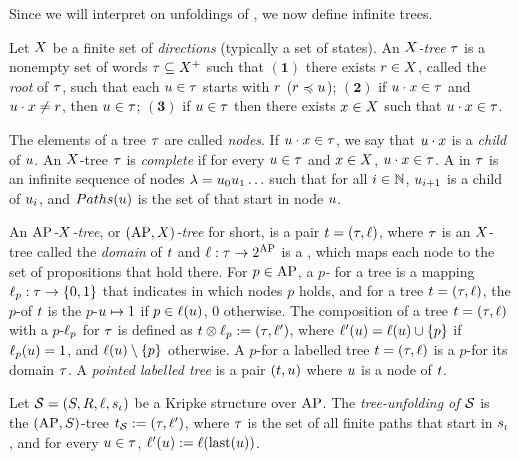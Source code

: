Since we will interpret \QCTLs on unfoldings of \KS, we now define
infinite trees.

\halfline
{}
Let $X$ be a finite set of \emph{directions} (typically a set of states). 
An \emph{$X$-tree} $\tau$ 
 is a nonempty set of words $\tau\subseteq X^+$ such that
 $\bm{(1)}$ there exists $r\in X$,  called the
    \emph{root} of $\tau$, such that each
    $u\in\tau$ starts with $r$ ($r\preccurlyeq u$);
$\bm{(2)}$  if $u\cdot x\in\tau$ and $u\cdot x\neq r$, then
    $u\in\tau$;
 $\bm{(3)}$ if $u\in\tau$ then there exists $x\in X$ such that $u\cdot x\in\tau$.

 The elements of a tree $\tau$ are called \emph{nodes}.  
  If 
 $u\cdot x \in \tau$, we say that $u\cdot x$ is a \emph{child} of
 $u$.
An $X$-tree $\tau$ is \emph{complete} if for every $u \in
\tau$ and  $x \in X$,  $u \cdot x \in \tau$.
A \emph{\tpath} in $\tau$ is an infinite sequence of nodes $\tpath=\noeud_0\noeud_1\ldots$
such that for all $i\in\mathbb N$, $u_{i+1}$ is a child of
$u_i$,
and $Paths(u)$ is the set of \tpaths
 that start in node $u$. 

 An \emph{$\textnormal{AP}$- $X$-tree}, or
\emph{$(\textnormal{AP},X)$-tree} for short, is a pair
$t=(\tau,\ell)$, where $\tau$ is an $X$-tree called the
\emph{domain} of $t$ and
$\ell:\tau \rightarrow 2^{\textnormal{AP}}$ is a \emph{}, which maps
each node to the set of propositions that hold there.
 For $p\in\textnormal{AP}$, a \emph{$p$-} for a  tree is a mapping
$\ell_{p}:\tau\to \{0,1\}$ that indicates in which nodes $p$ holds, and
for a  tree $t=(\tau,\ell)$, the $p$- of $t$ is
the $p$- $u \mapsto 1$ if $p\in\ell(u)$, 0 otherwise. 
The composition of a  tree $t=(\tau,\ell)$ with a
$p$- $\ell_{p}$ for $\tau$ is defined as
$t\otimes\ell_{p}:=(\tau,\ell')$, where
$\ell'(u)=\ell(u)\cup \{p\}$ if $\ell_{p}(u)=1$, and
$\ell(u)\setminus \{p\}$ otherwise.
A $p$- for a labelled tree $t=(\tau,\ell)$ is a
$p$- for its domain $\tau$.
A \emph{pointed labelled tree} is a pair $(t,u)$ where
 $u$ is a node of $t$.

Let $\KS=(\setstates,\relation,\lab,\sstate_\init)$ be a Kripke structure over $\textnormal{AP}$. 
The \emph{tree-unfolding of $\KS$} is the $(\textnormal{AP},S)$-tree $\unfold{\sstate}\egdef (\tree,\lab')$, where
    $\tau$ is the set
    of all finite  paths that start in $s_{\iota}$, and
    for every $u\in\tau$,
    $\ell'(u):= \ell(\mbox{last}(u))$.

